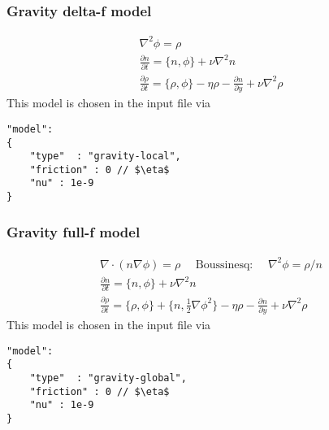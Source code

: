 \subsubsection{Gravity delta-f model}
\begin{subequations}
\begin{align}
 \nabla^2 \phi = \rho \\
 \frac{\partial n}{\partial t} = \{ n, \phi\} + \nu \nabla^2 n  \\
  \frac{\partial \rho}{\partial t} = \{ \rho, \phi\} - \eta \rho - \frac{\partial n}{\partial y} + \nu \nabla^2 \rho
\end{align}
\end{subequations}
This model is chosen in the input file via
\begin{verbatim}
"model":
{
    "type"  : "gravity-local",
    "friction" : 0 // $\eta$
    "nu" : 1e-9
}
\end{verbatim}


\subsubsection{Gravity full-f model}
\begin{subequations}
\begin{align}
 \nabla \cdot(n \nabla \phi) = \rho \quad\text{ Boussinesq: }\quad \nabla^2 \phi = \rho/n \\
 \frac{\partial n}{\partial t} = \{ n, \phi\} +  \nu \nabla^2 n  \\
  \frac{\partial \rho}{\partial t} = \{ \rho, \phi\} + \{n, \frac{1}{2} \nabla\phi^2\} - \eta \rho - \frac{\partial n}{\partial y} +\nu\nabla^2\rho
\end{align}
\end{subequations}
This model is chosen in the input file via
\begin{verbatim}
"model":
{
    "type"  : "gravity-global",
    "friction" : 0 // $\eta$
    "nu" : 1e-9
}
\end{verbatim}

